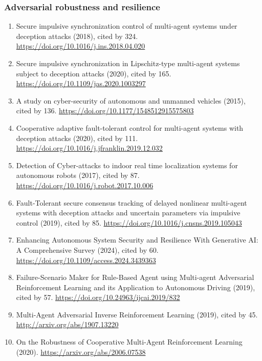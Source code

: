 \documentclass[
]{article}
\providecommand{\tightlist}{%
  \setlength{\itemsep}{0pt}\setlength{\parskip}{0pt}}
\begin{document}
\hypertarget{adversarial-robustness-and-resilience}{%
\subsubsection{Adversarial robustness and
resilience}\label{adversarial-robustness-and-resilience}}

\begin{enumerate}
\def\labelenumi{\arabic{enumi}.}
\tightlist
\item
  Secure impulsive synchronization control of multi-agent systems under
  deception attacks (2018), cited by 324.
  \url{https://doi.org/10.1016/j.ins.2018.04.020}
\item
  Secure impulsive synchronization in Lipschitz-type multi-agent systems
  subject to deception attacks (2020), cited by 165.
  \url{https://doi.org/10.1109/jas.2020.1003297}
\item
  A study on cyber-security of autonomous and unmanned vehicles (2015),
  cited by 136. \url{https://doi.org/10.1177/1548512915575803}
\item
  Cooperative adaptive fault-tolerant control for multi-agent systems
  with deception attacks (2020), cited by 111.
  \url{https://doi.org/10.1016/j.jfranklin.2019.12.032}
\item
  Detection of Cyber-attacks to indoor real time localization systems
  for autonomous robots (2017), cited by 87.
  \url{https://doi.org/10.1016/j.robot.2017.10.006}
\item
  Fault-Tolerant secure consensus tracking of delayed nonlinear
  multi-agent systems with deception attacks and uncertain parameters
  via impulsive control (2019), cited by 85.
  \url{https://doi.org/10.1016/j.cnsns.2019.105043}
\item
  Enhancing Autonomous System Security and Resilience With Generative
  AI: A Comprehensive Survey (2024), cited by 60.
  \url{https://doi.org/10.1109/access.2024.3439363}
\item
  Failure-Scenario Maker for Rule-Based Agent using Multi-agent
  Adversarial Reinforcement Learning and its Application to Autonomous
  Driving (2019), cited by 57.
  \url{https://doi.org/10.24963/ijcai.2019/832}
\item
  Multi-Agent Adversarial Inverse Reinforcement Learning (2019), cited
  by 45. \url{http://arxiv.org/abs/1907.13220}
\item
  On the Robustness of Cooperative Multi-Agent Reinforcement Learning
  (2020). \url{https://arxiv.org/abs/2006.07538}
\end{enumerate}
\end{document}
